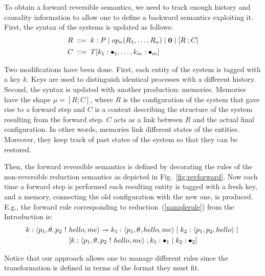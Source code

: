 \documentclass{article}[12pt,a4paper]
\theoremstyle{definition}
\newcommand{\paral}{\;|\;}
\begin{document}
To obtain a forward reversible semantics, we need to track enough history and causality information to allow one to define a backward semantics exploiting it. First, the syntax of the
systems is updated as follows:\\
\[
\begin{array}{l}
  R   \; ::=\;  k:P \paral \op(R_1,\ldots,R_n)\paral \nil \paral \mem{R}{\str} \\[1ex]
  \str \; ::= \; T[k_1:\blt_1,\dots,k_m:\blt_m]
\end{array}
\]

Two modifications have been done. First, each entity of the system is tagged with
a key $k$. Keys are used to distinguish identical processes with a different
history. Second, the syntax is updated with another production: memories. Memories have
the shape $\mu=[R;C]$, where $R$ is the configuration of the
system that gave rise to a forward step and $C$ is a context describing the structure of the system resulting from the forward step.
$C$ acts as a link between $R$ and the actual final configuration. In
other words, memories link different states of the entities. Moreover, they keep
track of past states of the system so that they can be restored.

Then, the forward reversible semantics is defined by decorating the rules of the non-reversible reduction semantics as depicted in
Fig.~\ref{fig:revforward}. Now each time a forward step is performed each resulting entity is tagged with a fresh
key, and a memory, connecting the old configuration with the new one, is produced.
E.g., the forward rule corresponding to reduction~(\ref{samplerule}) from the Introduction is:
\begin{multline*}
k:\langle p_1, \theta, p_2~\ms{!}~hello, me\rangle \flts{} k_1:\langle p_1, \theta,
hello, me\rangle \paral k_2: \langle p_1, p_2,hello \rangle \paral\\ \mem{k:\langle p_1, \theta, p_2~\ms{!}~hello, me\rangle}{k_1:\bullet_1 \paral k_2:\bullet_2}
\end{multline*}

Notice that our approach allows one to manage different rules since the transformation is defined in terms of the format they must fit.
\end{document}
